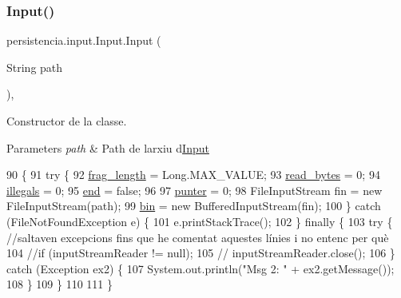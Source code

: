 \subsubsection{\texorpdfstring{Input()}{Input()}}
{\footnotesize\ttfamily persistencia.\+input.\+Input.\+Input (\begin{DoxyParamCaption}\item[{String}]{path }\end{DoxyParamCaption})\hspace{0.3cm}{\ttfamily [inline]}, {\ttfamily [private]}}



Constructor de la classe. 


\begin{DoxyParams}{Parameters}
{\em path} & Path de l\textquotesingle{}arxiu d\textquotesingle{}\hyperlink{classpersistencia_1_1input_1_1Input}{Input} \\
\hline
\end{DoxyParams}

\begin{DoxyCode}
90                                \{
91         \textcolor{keywordflow}{try} \{   
92             \hyperlink{classpersistencia_1_1input_1_1Input_adae91120899054fe5200d5e307840042}{frag\_length} = Long.MAX\_VALUE;
93             \hyperlink{classpersistencia_1_1input_1_1Input_ace2c934234f82fb07ae169b50f71cd32}{read\_bytes} = 0;
94             \hyperlink{classpersistencia_1_1input_1_1Input_ad3132949d4ac469b5f4d77373389f9f1}{illegals} = 0;
95             \hyperlink{classpersistencia_1_1input_1_1Input_aa986cd4af0178e1a80f551dcd8936125}{end} = \textcolor{keyword}{false};
96 
97             \hyperlink{classpersistencia_1_1input_1_1Input_abe76388d0ac9eeafdba673ad2138f8dc}{punter} = 0;
98             FileInputStream fin = \textcolor{keyword}{new} FileInputStream(path);
99             \hyperlink{classpersistencia_1_1input_1_1Input_aa4b622d30a090256ce05c5082cdb0791}{bin} = \textcolor{keyword}{new} BufferedInputStream(fin);
100         \} \textcolor{keywordflow}{catch} (FileNotFoundException e) \{
101             e.printStackTrace();
102         \} \textcolor{keywordflow}{finally} \{
103             \textcolor{keywordflow}{try} \{ \textcolor{comment}{//saltaven excepcions fins que he comentat aquestes línies i no entenc per què}
104                 \textcolor{comment}{//if (inputStreamReader != null);}
105                 \textcolor{comment}{//    inputStreamReader.close();}
106             \} \textcolor{keywordflow}{catch} (Exception ex2) \{
107                 System.out.println(\textcolor{stringliteral}{"Msg 2: "} + ex2.getMessage());
108             \}
109         \}
110 
111     \}
\end{DoxyCode}


